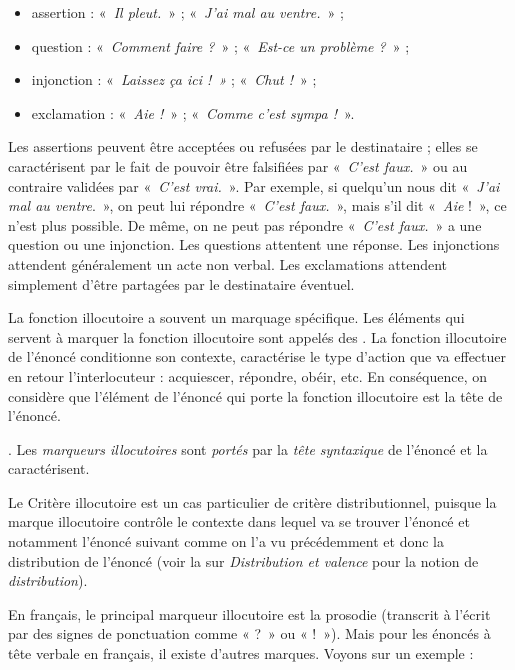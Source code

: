 \begin{itemize}
\item assertion : «~\textit{Il pleut.}~» ; «~\textit{J’ai mal au ventre.}~» ;
\item question : «~\textit{Comment faire ?}~» ; «~\textit{Est-ce un problème ?}~» ;
\item injonction : «~\textit{Laissez ça ici !~»} ; «~\textit{Chut !}~» ;
\item exclamation : «~\textit{Aie !}~» ; «~\textit{Comme c’est sympa !}~».
\end{itemize}

Les assertions peuvent être acceptées ou refusées par le destinataire ; elles se caractérisent par le fait de pouvoir être falsifiées par «~\textit{C’est faux.}~» ou au contraire validées par «~\textit{C’est vrai.}~». Par exemple, si quelqu’un nous dit «~\textit{J’ai mal au ventre}.~», on peut lui répondre «~\textit{C’est faux.}~», mais s’il dit «~\textit{Aie} !~», ce n’est plus possible. De même, on ne peut pas répondre «~\textit{C’est faux.}~» a une question ou une injonction. Les questions attentent une réponse. Les injonctions attendent généralement un acte non verbal. Les exclamations attendent simplement d’être partagées par le destinataire éventuel.

La fonction illocutoire a souvent un marquage spécifique. Les éléments qui servent à marquer la fonction illocutoire sont appelés des . La fonction illocutoire de l'énoncé conditionne son contexte, caractérise le type d'action que va effectuer en retour l'interlocuteur : acquiescer, répondre, obéir, etc. En conséquence, on considère que l'élément de l'énoncé qui porte la fonction illocutoire est la tête de l'énoncé.

{. Les \textit{marqueurs illocutoires} sont \textit{portés} par la \textit{tête syntaxique} de l’énoncé et la caractérisent.}

Le Critère illocutoire est un cas particulier de critère distributionnel, puisque la marque illocutoire contrôle le contexte dans lequel va se trouver l'énoncé et notamment l'énoncé suivant comme on l'a vu précédemment et donc la distribution de l'énoncé (voir la  sur \textit{Distribution et valence} pour la notion de \textit{distribution}).

En français, le principal marqueur illocutoire est la prosodie (transcrit à l’écrit par des signes de ponctuation comme « ?~» ou « !~»). Mais pour les énoncés à tête verbale en français, il existe d’autres marques. Voyons sur un exemple :

